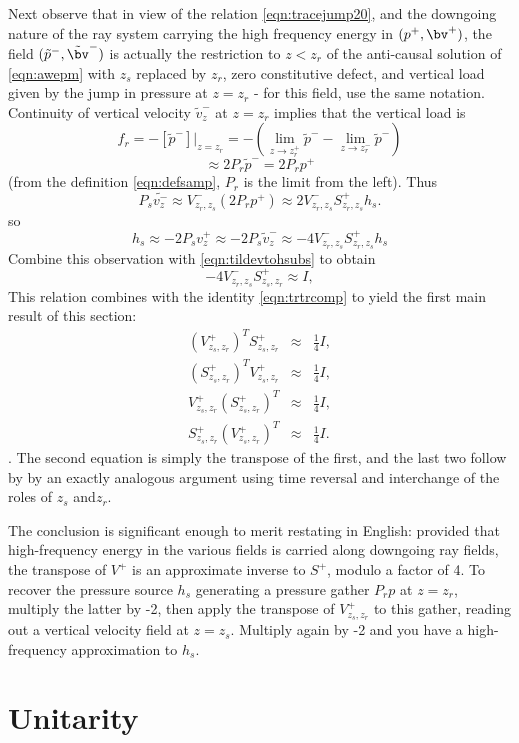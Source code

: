 Next observe that in view of the relation \ref{eqn:tracejump20}, and
the downgoing nature of the ray system carrying the high frequency
energy in $(p^+,\bv^+)$, the field $(\tilde{p}^-,\tilde{\bv}^-)$ is
actually the restriction to $z<z_r$ of the anti-causal solution of \ref{eqn:awepm}
with $z_s$ replaced by $z_r$, zero constitutive defect, and vertical
load given by the jump in pressure at $z=z_r$ - for this field, use
the same notation. Continuity of vertical
velocity $\tilde{v}^-_z$ at $z=z_r$ implies that the vertical load is
\[
  f_r = -[\tilde{p}^-]|_{z=z_r} =-(\lim_{z\rightarrow
    z_r^+}\tilde{p}^- - \lim_{z\rightarrow
    z_r^-}\tilde{p}^-)
\]
\[
  \approx 2 P_r \tilde{p}^- = 2 P_r p^+
\]
(from the definition \ref{eqn:defsamp}, $P_r$ is the limit from the
left). Thus
\[
  P_s \tilde{v^-_z} \approx V^-_{z_r,z_s}(2 P_rp^+) \approx
  2V^-_{z_r,z_s}S^+_{z_r,z_s}h_s.
\]
so
\[
  h_s \approx -2 P_s v^+_z \approx -2 P_s \tilde{v}^-_z \approx
  -4V^-_{z_r,z_s}S^+_{z_r,z_s}h_s
\]
Combine this observation with \ref{eqn:tildevtohsubs} to obtain
\[
 -4  V^-_{z_r,z_s} S^+_{z_s,z_r}  \approx  I,
\]
This relation combines with the identity \ref{eqn:trtrcomp} to
yield the first main result of this section:
\begin{eqnarray}
  \label{eqn:approxinv}
  (V^+_{z_s,z_r})^T S^+_{z_s,z_r} & \approx & \frac{1}{4}I, \nonumber\\
  (S^+_{z_s,z_r})^T V^+_{z_s,z_r} & \approx & \frac{1}{4}I, \nonumber\\
  V^+_{z_s,z_r} (S^+_{z_s,z_r})^T & \approx & \frac{1}{4}I, \nonumber\\
  S^+_{z_s,z_r} (V^+_{z_s,z_r})^T & \approx & \frac{1}{4}I.
\end{eqnarray}.
The second equation is simply the transpose of the first, and the
last two follow by by an exactly analogous argument using time
reversal and interchange of the roles of $z_s$ and$z_r$.

The conclusion is significant enough to merit restating in English:
provided that high-frequency energy in the various fields is carried
along downgoing ray fields, the transpose of $V^+$ is an approximate
inverse to $S^+$, modulo a factor of 4. To recover the pressure source
$h_s$ generating a pressure gather $P_rp$ at $z=z_r$, multiply the
latter by -2, then apply the transpose of $V^+_{z_s,z_r}$ to this
gather, reading out a vertical velocity field at $z=z_s$. Multiply
again by -2 and you have a high-frequency approximation to $h_s$.


\section{Unitarity}

